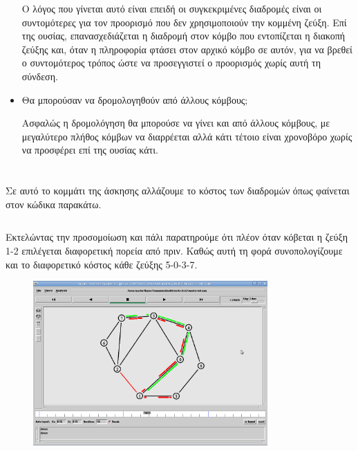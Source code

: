 \documentclass[a4paper,9pt]{article}
\begin{document}
\begin{itemize}
        Ο λόγος που γίνεται αυτό είναι επειδή οι συγκεκριμένες διαδρομές είναι οι
        συντομότερες για τον προορισμό που δεν χρησιμοποιούν την κομμένη ζεύξη. Επί
        της ουσίας, επανασχεδιάζεται η διαδρομή στον κόμβο που εντοπίζεται η διακοπή
        ζεύξης και, όταν η πληροφορία φτάσει στον αρχικό κόμβο σε αυτόν, για να βρεθεί
        ο συντομότερος τρόπος ώστε να προσεγγιστεί ο προορισμός χωρίς αυτή τη σύνδεση.
    \item Θα μπορούσαν να δρομολογηθούν από άλλους κόμβους;

        Ασφαλώς η δρομολόγηση θα μπορούσε να γίνει και από άλλους κόμβους, με
        μεγαλύτερο πλήθος κόμβων να διαρρέεται αλλά κάτι τέτοιο είναι χρονοβόρο χωρίς
        να προσφέρει επί της ουσίας κάτι.
\end{itemize}


\section{}
Σε αυτό το κομμάτι της άσκησης αλλάζουμε το κόστος των διαδρομών όπως φαίνεται
στον κώδικα παρακάτω.

\inputminted[fontsize=\footnotesize]{tcl}{files/ex3_3.tcl}

Εκτελώντας την προσομοίωση και πάλι παρατηρούμε ότι πλέον όταν κόβεται η ζεύξη
1-2 επιλέγεται διαφορετική πορεία από πριν. Καθώς  αυτή τη φορά
συνοπολογίζουμε και το διαφορετικό κόστος κάθε ζεύξης 5-0-3-7.

\begin{figure}[H]
    \centering
    \includegraphics[width=0.8\textwidth]{files/8.png}
\end{figure}
\end{document}
